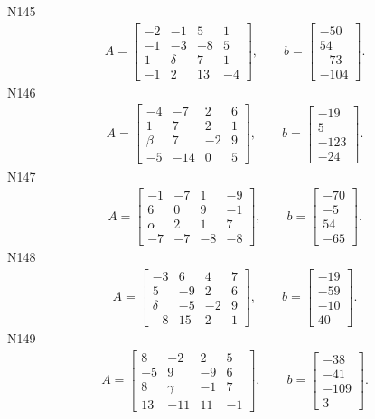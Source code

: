\documentclass[11pt]{report}
\begin{document}
N145
\begin{align*}
 A = \left[\begin{matrix}-2 & -1 & 5 & 1\\-1 & -3 & -8 & 5\\1 & \delta & 7 & 1\\-1 & 2 & 13 & -4\end{matrix}\right],
\qquad b = \left[\begin{matrix}-50\\54\\-73\\-104\end{matrix}\right]. 
 \end{align*}
N146
\begin{align*}
 A = \left[\begin{matrix}-4 & -7 & 2 & 6\\1 & 7 & 2 & 1\\\beta & 7 & -2 & 9\\-5 & -14 & 0 & 5\end{matrix}\right],
\qquad b = \left[\begin{matrix}-19\\5\\-123\\-24\end{matrix}\right]. 
 \end{align*}
N147
\begin{align*}
 A = \left[\begin{matrix}-1 & -7 & 1 & -9\\6 & 0 & 9 & -1\\\alpha & 2 & 1 & 7\\-7 & -7 & -8 & -8\end{matrix}\right],
\qquad b = \left[\begin{matrix}-70\\-5\\54\\-65\end{matrix}\right]. 
 \end{align*}
N148
\begin{align*}
 A = \left[\begin{matrix}-3 & 6 & 4 & 7\\5 & -9 & 2 & 6\\\delta & -5 & -2 & 9\\-8 & 15 & 2 & 1\end{matrix}\right],
\qquad b = \left[\begin{matrix}-19\\-59\\-10\\40\end{matrix}\right]. 
 \end{align*}
N149
\begin{align*}
 A = \left[\begin{matrix}8 & -2 & 2 & 5\\-5 & 9 & -9 & 6\\8 & \gamma & -1 & 7\\13 & -11 & 11 & -1\end{matrix}\right],
\qquad b = \left[\begin{matrix}-38\\-41\\-109\\3\end{matrix}\right]. 
 \end{align*}
\end{document}

